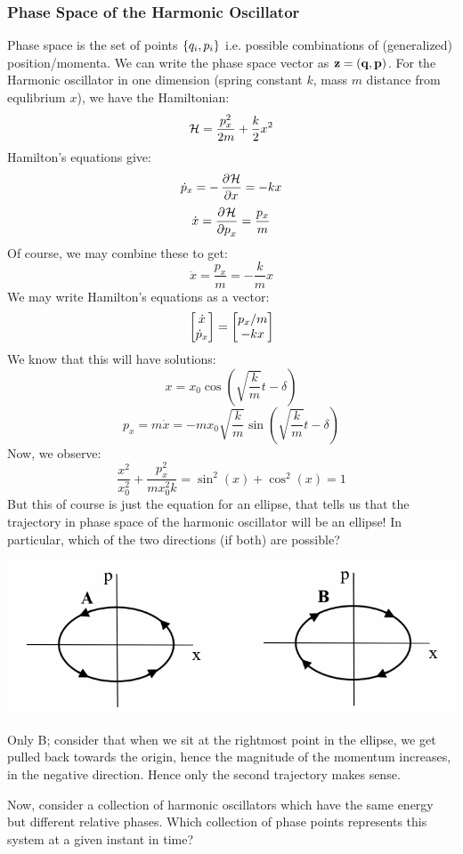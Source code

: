 \subsubsection{Phase Space of the Harmonic Oscillator}
Phase space is the set of points $\set{q_i, p_i}$ i.e. possible combinations of (generalized) position/momenta. We can write the phase space vector as $\mathbf{z} = (\mathbf{q}, \mathbf{p})$. For the Harmonic oscillator in one dimension (spring constant $k$, mass $m$ distance from equlibrium $x$), we have the Hamiltonian:
\[\mathcal{H} = \frac{p_x^2}{2m} + \frac{k}{2}x^2\]
Hamilton's equations give:
\[\dot{p}_x = -\dpd{\HH}{x} = -kx\]
\[\dot{x} = \dpd{\HH}{p_x} = \frac{p_x}{m}\]
Of course, we may combine these to get:
\[\ddot{x} = \frac{p_x}{m} = -\frac{k}{m}x\]
We may write Hamilton's equations as a vector:
\[\begin{bmatrix}\dot{x} \\ \dot{p}_x\end{bmatrix} = \begin{bmatrix}p_x/m \\ -kx\end{bmatrix}\]
We know that this will have solutions:
\[x = x_0\cos(\sqrt{\frac{k}{m}}t - \delta)\]
\[p_x = m\dot{x} = -mx_0\sqrt{\frac{k}{m}}\sin(\sqrt{\frac{k}{m}}t - \delta)\]
Now, we observe:
\[\frac{x^2}{x_0^2} + \frac{p_x^2}{mx_0^2k} = \sin^2(x) + \cos^2(x) = 1\]
But this of course is just the equation for an ellipse, that tells us that the trajectory in phase space of the harmonic oscillator will be an ellipse! In particular, which of the two directions (if both) are possible?
\begin{center}
    \includegraphics[scale=0.8]{Lecture-23/l23-img2.png}
\end{center}
\begin{s}
Only B; consider that when we sit at the rightmost point in the ellipse, we get pulled back towards the origin, hence the magnitude of the momentum increases, in the negative direction. Hence only the second trajectory makes sense. 
\end{s}
Now, consider a collection of harmonic oscillators which have the same energy but different relative phases. Which collection of phase points represents this system at a given instant in time?

